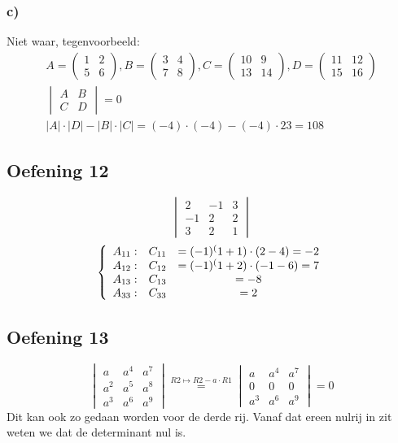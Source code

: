 \documentclass[lineaire_algebra_oplossingen.tex]{subfiles}
\begin{document}
\subsubsection*{c)}
Niet waar, tegenvoorbeeld:
\begin{gather*}
    A = 
    \begin{pmatrix}
        1 & 2\\
        5 & 6
    \end{pmatrix} 
    , B = 
    \begin{pmatrix}
        3 & 4\\
        7 & 8
    \end{pmatrix}
    , C = 
    \begin{pmatrix}
        10 & 9\\
        13 & 14
    \end{pmatrix}
    , D = 
    \begin{pmatrix}
        11 & 12\\
        15 & 16
    \end{pmatrix}\\
    \begin{vmatrix}
        A & B\\
        C & D
    \end{vmatrix}
    = 0\\
    |A| \cdot |D| - |B| \cdot |C| = (-4) \cdot (-4) - (-4) \cdot 23 = 108
\end{gather*}


\subsection{Oefening 12}
\[
\begin{vmatrix}
2 & -1 & 3\\
-1 & 2 & 2\\
3 & 2 & 1
\end{vmatrix}
\]
\[
\left\lbrace
\begin{array}{c c c}
A_{11}: &C_{11} &= (-1)^(1+1) \cdot (2 - 4) = -2\\
A_{12}: &C_{12} &= (-1)^(1+2) \cdot (-1 -6) = 7\\
A_{13}: &C_{13} &= -8\\
A_{33}: &C_{33} &= 2\\
\end{array}
\right.
\]
\subsection{Oefening 13}
$$
\begin{vmatrix}
a & a^4 & a^7\\
a^2 & a^5 & a^8\\
a^3 & a^6 & a^9
\end{vmatrix}
\overset{R2 \longmapsto R2 - a \cdot R1}{=}
\begin{vmatrix}
a & a^4 & a^7\\
0 & 0 & 0\\
a^3 & a^6 & a^9
\end{vmatrix}
= 0
$$
Dit kan ook zo gedaan worden voor de derde rij. Vanaf dat ereen nulrij in zit weten we dat de determinant nul is.
\end{document}
